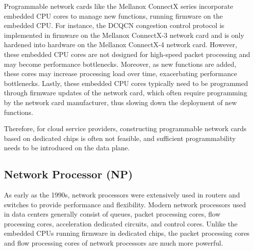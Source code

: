 Programmable network cards like the Mellanox ConnectX series incorporate embedded CPU cores to manage new functions, running firmware on the embedded CPU. For instance, the DCQCN congestion control protocol is implemented in firmware on the Mellanox ConnectX-3 network card and is only hardened into hardware on the Mellanox ConnectX-4 network card. However, these embedded CPU cores are not designed for high-speed packet processing and may become performance bottlenecks. Moreover, as new functions are added, these cores may increase processing load over time, exacerbating performance bottlenecks. Lastly, these embedded CPU cores typically need to be programmed through firmware updates of the network card, which often require programming by the network card manufacturer, thus slowing down the deployment of new functions.

Therefore, for cloud service providers, constructing programmable network cards based on dedicated chips is often not feasible, and sufficient programmability needs to be introduced on the data plane.

\subsection{Network Processor (NP)}
\label{smartnic-np}

As early as the 1990s, network processors were extensively used in routers and switches to provide performance and flexibility. Modern network processors used in data centers generally consist of queues, packet processing cores, flow processing cores, acceleration dedicated circuits, and control cores. Unlike the embedded CPUs running firmware in dedicated chips, the packet processing cores and flow processing cores of network processors are much more powerful.

